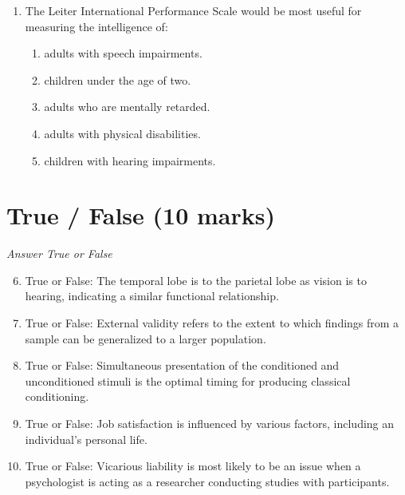 \documentclass[12pt]{article}
\begin{document}
\begin{enumerate}[label=\arabic*.]
\begin{enumerate}[label=(\alph*)]
    \item nonessential subjects like art and music.
    \item fostering collaborative learning environments.
    \item traditional subjects and methods.
    \item promoting physical education and sports.
    \item cultivating social intelligence.
\end{enumerate}
\item The Leiter International Performance Scale would be most useful for measuring the
intelligence of:
\begin{enumerate}[label=(\alph*)]
    \item adults with speech impairments.
    \item children under the age of two.
    \item adults who are mentally retarded.
    \item adults with physical disabilities.
    \item children with hearing impairments.
\end{enumerate}
\end{enumerate}

\section*{True / False (10 marks)}
\textit{Answer True or False}
\begin{enumerate}[label=\arabic*.]
\setcounter{enumi}{5}
\item True or False: The temporal lobe is to the parietal lobe as vision is to hearing, indicating a similar functional relationship.
\item True or False: External validity refers to the extent to which findings from a sample can be generalized to a larger population.
\item True or False: Simultaneous presentation of the conditioned and unconditioned stimuli is the optimal timing for producing classical conditioning.
\item True or False: Job satisfaction is influenced by various factors, including an individual's personal life.
\item True or False: Vicarious liability is most likely to be an issue when a psychologist is acting as a researcher conducting studies with participants.
\end{enumerate}
\end{document}
